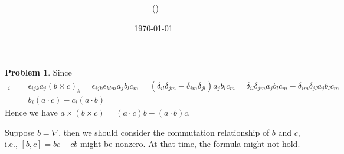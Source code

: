 \documentclass[twoside,11pt]{article}
\title{{\lms \Code \ \Ass}}
\author{\lms \name \ (\href{mailto:\mail}{\mail})}
\date{\sffamily \today}
\makeatletter
\theoremstyle{definition}
\newtheorem{problem}{Problem}
\theoremstyle{remark}
\newtheorem*{remark}{Remark}
\renewcommand{\maketitle}{\bgroup\setlength{\parindent}{0pt}
\begin{flushleft}
  \textbf{\Large\@title}

  \@author
\end{flushleft}\egroup
}
\makeatother
\begin{document}
\maketitle
\thispagestyle{title}


\begin{problem}
Since 
\begin{align*}
    [a\times(b\times c)]_i &= 
    \epsilon_{ijk}a_j (b\times c)_k
    = \epsilon_{ijk}\epsilon_{klm} a_jb_lc_m
    = (\delta_{il}\delta_{jm} - \delta_{im}\delta_{jl})
    a_jb_lc_m
    = \delta_{il}\delta_{jm}a_jb_lc_m
    - \delta_{im}\delta_{jl}a_jb_lc_m\\
    &= b_i(a\cdot c) - c_i(a\cdot b)
\end{align*}
Hence we have $a\times (b\times c) = (a\cdot c)b - (a\cdot b)c$.

Suppose $b=\nabla$, then we should consider the commutation relationship
of $b$ and $c$, i.e., $[b,c]=bc-cb$ might be nonzero.
At that time, the formula might not hold.

\end{problem}
\end{document}
